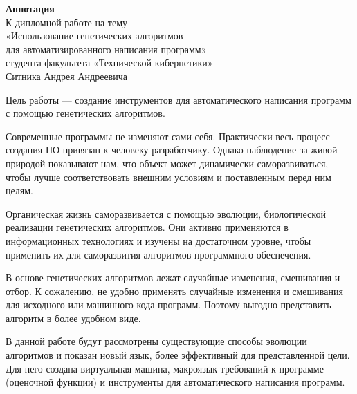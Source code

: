 \documentclass[a4paper,14pt]{extarticle}
\begin{document}
\begin{center}
\textbf{Аннотация}\\
К дипломной работе на тему
\\«Использование генетических алгоритмов\\
для автоматизированного написания программ»\\
студента факультета «Технической кибернетики»\\
Ситника Андрея Андреевича
\end{center}

Цель работы — создание инструментов для автоматического написания программ с
помощью генетических алгоритмов.

Современные программы не изменяют сами себя. Практически весь процесс создания
ПО привязан к человеку-разработчику. Однако наблюдение за живой природой
показывают нам, что объект может динамически саморазвиваться, чтобы лучше
соответствовать внешним условиям и поставленным перед ним целям.

Органическая жизнь саморазвивается с помощью эволюции, биологической реализации
генетических алгоритмов. Они активно применяются в информационных технологиях и
изучены на достаточном уровне, чтобы применить их для саморазвития алгоритмов
программного обеспечения.

В основе генетических алгоритмов лежат случайные изменения, смешивания и отбор.
К сожалению, не удобно применять случайные изменения и смешивания для исходного
или машинного кода программ. Поэтому выгодно представить алгоритм в более
удобном виде.

В данной работе будут рассмотрены существующие способы эволюции алгоритмов и
показан новый язык, более эффективный для представленной цели. Для него создана
виртуальная машина, макроязык требований к программе (оценочной функции) и
инструменты для автоматического написания программ.
\end{document}
